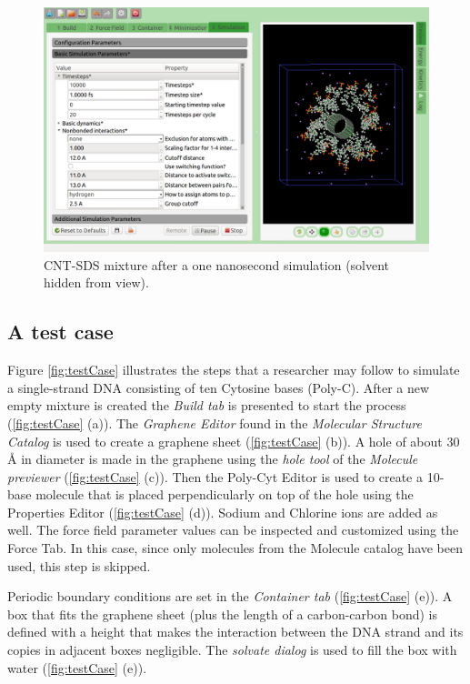 \documentclass{article}
\begin{document}
\begin{figure}
\begin{center}
  \includegraphics[scale=0.4]{result.png} 
  \caption{CNT-SDS mixture after a one nanosecond simulation (solvent hidden from view).}
  \label{fig:result}

\end{center}\end{figure}


\subsection{A test case}


Figure \ref{fig:testCase} illustrates the steps that a researcher may follow to simulate a single-strand DNA consisting of ten Cytosine bases (Poly-C). After a new empty mixture is created the \textit{Build tab} is presented to start the process (\ref{fig:testCase} (a)).  
The \textit{Graphene Editor} found in the \textit{Molecular Structure Catalog} is used to create a graphene sheet (\ref{fig:testCase} (b)).  A hole of about 30 {\AA} in diameter is made in the graphene using the \textit{hole tool} of the \textit{Molecule previewer} (\ref{fig:testCase} (c)).  
Then the Poly-Cyt Editor is used to create a 10-base molecule that is placed perpendicularly on top of the hole using the Properties Editor (\ref{fig:testCase} (d)). Sodium and Chlorine ions are added as well.
The force field parameter values can be inspected and customized using the Force Tab.  In this case, since only molecules from the Molecule catalog have been used, this step is skipped.

Periodic boundary conditions are set in the \textit{Container tab} (\ref{fig:testCase} (e)).  A box that fits the graphene sheet (plus the length of a carbon-carbon bond) is defined with a height that makes the interaction between the DNA strand and its copies in adjacent boxes negligible.  The \textit{solvate dialog} is used to fill the box with water (\ref{fig:testCase} (e)).
\end{document}
